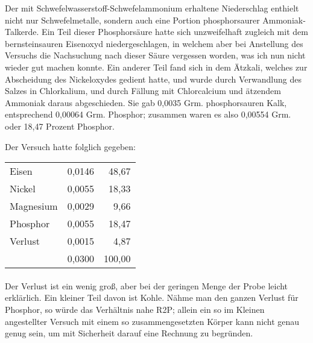 \documentclass[a4paper, 11pt, oneside]{article}
\begin{document}
Der mit Schwefelwasserstoff-Schwefelammonium erhaltene Niederschlag enthielt nicht nur Schwefelmetalle, sondern auch eine Portion phosphorsaurer Ammoniak-Talkerde. Ein Teil dieser Phosphorsäure hatte sich unzweifelhaft zugleich mit dem bernsteinsauren Eisenoxyd niedergeschlagen, in welchem aber bei Anstellung des Versuchs die Nachsuchung nach dieser Säure vergessen worden, was ich nun nicht wieder gut machen konnte. Ein anderer Teil fand sich in dem Ätzkali, welches zur Abscheidung des Nickeloxydes gedient hatte, und wurde durch Verwandlung des Salzes in Chlorkalium, und durch Fällung mit Chlorcalcium und ätzendem Ammoniak daraus abgeschieden. Sie gab 0,0035 Grm. phosphorsauren Kalk, entsprechend 0,00064 Grm. Phosphor; zusammen waren es also 0,00554 Grm. oder 18,47 Prozent Phosphor.

Der Versuch hatte folglich gegeben:
\begin{center}
\begin{tabular}{ l r r }
    Eisen & 0,0146 & 48,67\\
    Nickel & 0,0055 & 18,33\\
    Magnesium & 0,0029 & 9,66\\
    Phosphor & 0,0055 & 18,47\\
    Verlust & 0,0015 & 4,87\\\hline
    & 0,0300 & 100,00\\
\end{tabular}
\end{center}
\paragraph{}
Der Verlust ist ein wenig groß, aber bei der geringen Menge der Probe leicht erklärlich. Ein kleiner Teil davon ist Kohle. Nähme man den ganzen Verlust für Phosphor, so würde das Verhältnis nahe R2P; allein ein so im Kleinen angestellter Versuch mit einem so zusammengesetzten Körper kann nicht genau genug sein, um mit Sicherheit darauf eine Rechnung zu begründen.
\end{document}
